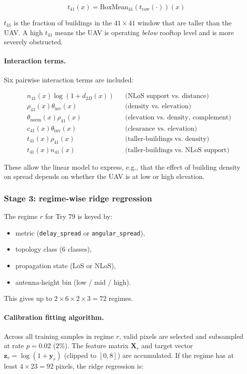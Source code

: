 \documentclass[11pt,a4paper]{article}
\begin{document}
\begin{equation}
t_{41}(x)=\mathrm{BoxMean}_{41}\!\left(t_{\mathrm{raw}}(\cdot)\right)(x)
\label{eq:t41}
\end{equation}

$t_{41}$ is the fraction of buildings in the $41\times 41$ window that are
taller than the UAV. A high $t_{41}$ means the UAV is operating \emph{below}
rooftop level and is more severely obstructed.

\paragraph{Interaction terms.}
Six pairwise interaction terms are included:

\begin{align}
&n_{41}(x)\log(1+d_{2D}(x)) && \text{(NLoS support vs.\ distance)}\\
&\rho_{41}(x)\theta_{\mathrm{inv}}(x) && \text{(density vs.\ elevation)}\\
&\theta_{\mathrm{norm}}(x)\rho_{41}(x) && \text{(elevation vs.\ density, complement)}\\
&c_{41}(x)\theta_{\mathrm{inv}}(x) && \text{(clearance vs.\ elevation)}\\
&t_{41}(x)\rho_{41}(x) && \text{(taller-buildings vs.\ density)}\\
&t_{41}(x)n_{41}(x) && \text{(taller-buildings vs.\ NLoS support)}
\end{align}

These allow the linear model to express, e.g., that the effect of building
density on spread depends on whether the UAV is at low or high elevation.

\subsubsection{Stage 3: regime-wise ridge regression}

The regime $r$ for Try 79 is keyed by:
\begin{itemize}
\item metric (\texttt{delay\_spread} or \texttt{angular\_spread}),
\item topology class (6 classes),
\item propagation state (LoS or NLoS),
\item antenna-height bin (low / mid / high).
\end{itemize}
This gives up to $2 \times 6 \times 2 \times 3 = 72$ regimes.

\paragraph{Calibration fitting algorithm.}
Across all training samples in regime $r$, valid pixels are selected and
subsampled at rate $p = 0.02$ (2\%). The feature matrix $\mathbf{X}_r$ and
target vector $\mathbf{z}_r = \log(1 + \mathbf{y}_r)$ (clipped to $[0, 8]$)
are accumulated. If the regime has at least $4 \times 23 = 92$ pixels, the
ridge regression is:
\end{document}
